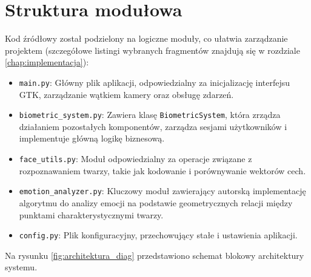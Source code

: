 \section{Struktura modułowa}
Kod źródłowy został podzielony na logiczne moduły, co ułatwia zarządzanie projektem (szczegółowe listingi wybranych fragmentów znajdują się w rozdziale \ref{chap:implementacja}):
\begin{itemize}
    \item \texttt{main.py}: Główny plik aplikacji, odpowiedzialny za inicjalizację interfejsu GTK, zarządzanie wątkiem kamery oraz obsługę zdarzeń.
    \item \texttt{biometric\_system.py}: Zawiera klasę \texttt{BiometricSystem}, która zrządza działaniem pozostałych komponentów, zarządza sesjami użytkowników i implementuje główną logikę biznesową.
    \item \texttt{face\_utils.py}: Moduł odpowiedzialny za operacje związane z rozpoznawaniem twarzy, takie jak kodowanie i porównywanie wektorów cech.
    \item \texttt{emotion\_analyzer.py}: Kluczowy moduł zawierający autorską implementację algorytmu do analizy emocji na podstawie geometrycznych relacji między punktami charakterystycznymi twarzy.
    \item \texttt{config.py}: Plik konfiguracyjny, przechowujący stałe i ustawienia aplikacji.
\end{itemize}

Na rysunku \ref{fig:architektura_diag} przedstawiono schemat blokowy architektury systemu.

